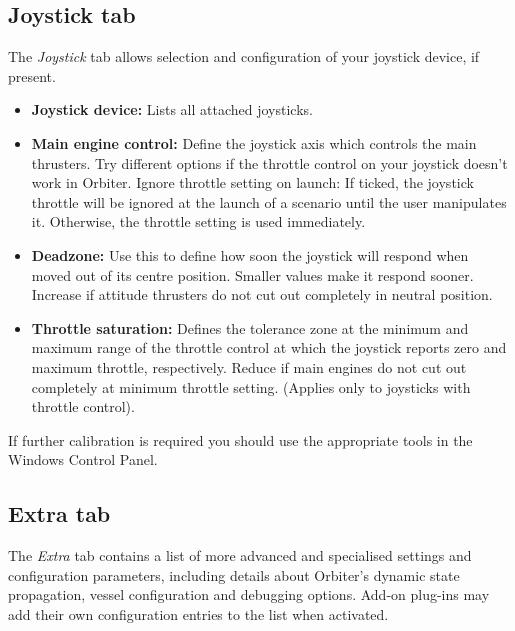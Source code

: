 \documentclass[Orbiter User Manual.tex]{subfiles}
\begin{document}
\subsection{Joystick tab}
The \textit{Joystick} tab allows selection and configuration of your joystick device, if present.

\begin{figure}[H]
	\centering
\end{figure}

\noindent

\begin{itemize}
\item \textbf{Joystick device:} Lists all attached joysticks.
\item \textbf{Main engine control:} Define the joystick axis which controls the main thrusters. Try different options if the throttle control on your joystick doesn't work in Orbiter.\newline
Ignore throttle setting on launch: If ticked, the joystick throttle will be ignored at the launch of a scenario until the user manipulates it. Otherwise, the throttle setting is used immediately.
\item \textbf{Deadzone:} Use this to define how soon the joystick will respond when moved out of its centre position. Smaller values make it respond sooner. Increase if attitude thrusters do not cut out completely in neutral position.
\item \textbf{Throttle saturation:} Defines the tolerance zone at the minimum and maximum range of the throttle control at which the joystick reports zero and maximum throttle, respectively. Reduce if main engines do not cut out completely at minimum throttle setting. (Applies only to joysticks with throttle control).
\end{itemize}

\noindent
If further calibration is required you should use the appropriate tools in the Windows Control Panel.


\subsection{Extra tab}
The \textit{Extra} tab contains a list of more advanced and specialised settings and configuration parameters, including details about Orbiter's dynamic state propagation, vessel configuration and debugging options. Add-on plug-ins may add their own configuration entries to the list when activated.
\end{document}
